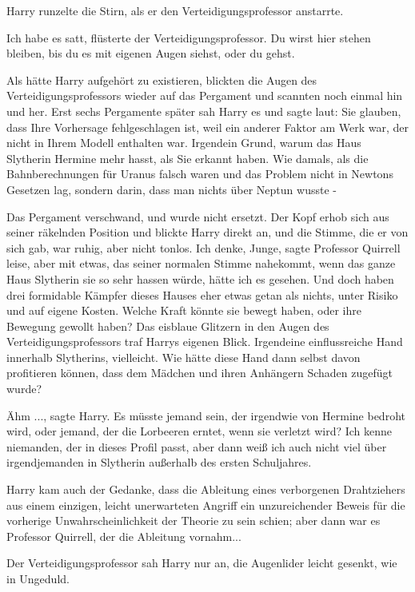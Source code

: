 Harry runzelte die Stirn, als er den Verteidigungsprofessor anstarrte.

\glqq Ich habe es satt\grqq{}, flüsterte der Verteidigungsprofessor. \glqq Du
wirst hier stehen bleiben, bis du es mit eigenen Augen siehst, oder du
gehst.\grqq{}

Als hätte Harry aufgehört zu existieren, blickten die Augen des
Verteidigungsprofessors wieder auf das Pergament und scannten noch einmal hin
und her. Erst sechs Pergamente später sah Harry es und sagte laut: \glqq Sie
glauben, dass Ihre Vorhersage fehlgeschlagen ist, weil ein anderer Faktor am
Werk war, der nicht in Ihrem Modell enthalten war. Irgendein Grund, warum das
Haus Slytherin Hermine mehr hasst, als Sie erkannt haben. Wie damals, als die
Bahnberechnungen für Uranus falsch waren und das Problem nicht in Newtons
Gesetzen lag, sondern darin, dass man nichts über Neptun wusste -\grqq{}

Das Pergament verschwand, und wurde nicht ersetzt. Der Kopf erhob sich aus
seiner räkelnden Position und blickte Harry direkt an, und die Stimme, die er
von sich gab, war ruhig, aber nicht tonlos. \glqq Ich denke, Junge\grqq{}, sagte
Professor Quirrell leise, aber mit etwas, das seiner normalen Stimme nahekommt,
\glqq wenn das ganze Haus Slytherin sie so sehr hassen würde, hätte ich es
gesehen. Und doch haben drei formidable Kämpfer dieses Hauses eher etwas getan
als nichts, unter Risiko und auf eigene Kosten. Welche Kraft könnte sie bewegt
haben, oder ihre Bewegung gewollt haben?\grqq{} Das eisblaue Glitzern in den
Augen des Verteidigungsprofessors traf Harrys eigenen Blick. \glqq Irgendeine
einflussreiche Hand innerhalb Slytherins, vielleicht. Wie hätte diese Hand dann
selbst davon profitieren können, dass dem Mädchen und ihren Anhängern Schaden
zugefügt wurde?\grqq{}

\glqq Ähm ...\grqq{}, sagte Harry. \glqq Es müsste jemand sein, der irgendwie
von Hermine bedroht wird, oder jemand, der die Lorbeeren erntet, wenn sie
verletzt wird? Ich kenne niemanden, der in dieses Profil passt, aber dann weiß
ich auch nicht viel über irgendjemanden in Slytherin außerhalb des ersten
Schuljahres.\grqq{}

Harry kam auch der Gedanke, dass die Ableitung eines verborgenen Drahtziehers
aus einem einzigen, leicht unerwarteten Angriff ein unzureichender Beweis für
die vorherige Unwahrscheinlichkeit der Theorie zu sein schien; aber dann war es
Professor Quirrell, der die Ableitung vornahm...

Der Verteidigungsprofessor sah Harry nur an, die Augenlider leicht gesenkt, wie
in Ungeduld.

